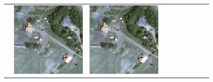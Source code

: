 \begin{figure}[H]
\begin{tabularx}{\textwidth}{c|*{9}{X}}
    & \includegraphics[trim={730pt 220pt 200pt 720pt},clip,width=\linewidth]{images/015Results/02perm_exp/comp_images/rgbir/523.png}
    & \includegraphics[trim={850pt 110pt 80pt 830pt},clip,width=\linewidth]{images/015Results/02perm_exp/comp_images/rgbir/523.png}

\end{tabularx}
\end{figure}
